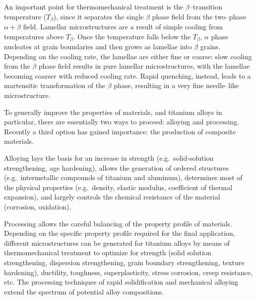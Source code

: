 An important point for thermomechanical treatment is the $\beta$--transition temperature ($T_\beta$), since it separates the single $\beta$ phase field from the two--phase $\alpha+\beta$ field. Lamellar microstructures are a result of simple cooling from temperatures above $T_\beta$. Once the temperature falls below the $T_\beta$, $\alpha$ phase nucleates at grain boundaries and then grows as lamellae into $\beta$ grains.
Depending on the cooling rate, the lamellae are either fine or coarse: slow cooling from the $\beta$ phase field results in pure lamellar microstructures, with the lamellae becoming coarser with reduced cooling rate. Rapid quenching, instead, leads to a martensitic transformation of the $\beta$ phase, resulting in a very fine needle--like microstructure.

To generally improve the properties of materials, and titanium alloys in particular, there are essentially two ways to proceed: alloying and processing. Recently a third option has gained importance: the production of composite materials. %

Alloying lays the basis for an increase in strength (e.g.\ solid-solution strengthening, age hardening), allows the generation of ordered structures (e.g.\ intermetallic compounds of titanium and aluminum), determines most of the physical properties (e.g.\ density, elastic modulus, coefficient of thermal expansion), and largely controls the chemical resistance of the material (corrosion, oxidation).

Processing allows the careful balancing of the property profile of materials. Depending on the specific property profile required for the final application, different microstructures can be generated for titanium alloys by means of thermomechanical treatment to optimize for strength (solid solution strengthening, dispersion strengthening, grain boundary strengthening, texture hardening), ductility, toughness, superplasticity, stress corrosion, creep resistance, etc. The processing techniques of rapid solidification and mechanical alloying extend the spectrum of potential alloy compositions.






